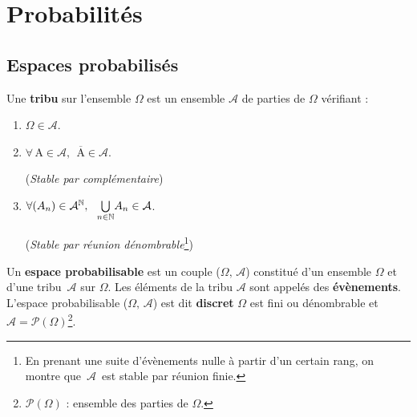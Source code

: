 \section{Probabilités}

\vspace{0.5cm}
\subsection{Espaces probabilisés}

\vspace{1cm}

Une \textbf{tribu} sur l'ensemble \(\Omega\) est un ensemble \(\mathcal{A}\) de parties de \(\Omega\) vérifiant :
\begin{enumerate}[leftmargin=2cm]
    \item \(\Omega \in \mathcal{A}\).
    
    \item \(\forall\, \text{A}\in \mathcal{A},\ \ \overline{\text{A}}\in \mathcal{A}\).\hspace{3cm}
    \begin{small}
        (\emph{Stable par complémentaire})
    \end{small}

    \item \(\forall (A_n)\in \mathcal{A}^\NN,\ \ \underset{n\in \NN}{\bigcup}A_n \in \mathcal{A}\). \hspace{1.3cm} 
    \begin{small}
        (\emph{Stable par réunion dénombrable}\footnote{En prenant une suite d'évènements nulle à partir d'un certain rang, on montre que \(\,\mathcal{A}\,\) est stable par réunion finie.})
    \end{small}
\end{enumerate}

\vspace{1cm}

Un \textbf{espace probabilisable} est un couple (\(\Omega,\,\mathcal{A}\)) constitué d'un ensemble \(\Omega\) et d'une tribu \(\,\mathcal{A}\) sur \(\Omega\). Les éléments de la tribu \(\mathcal{A}\) sont appelés des \textbf{évènements}. L'espace probabilisable (\(\Omega,\,\mathcal{A}\)) est dit \textbf{discret} \ssi \(\Omega\) est fini ou dénombrable et \(\mathcal{A}=\mathcal{P}(\Omega)\)\footnote{$\mathcal{P}(\Omega)$ : ensemble des parties de $\Omega$.}.

\vspace{1cm}

